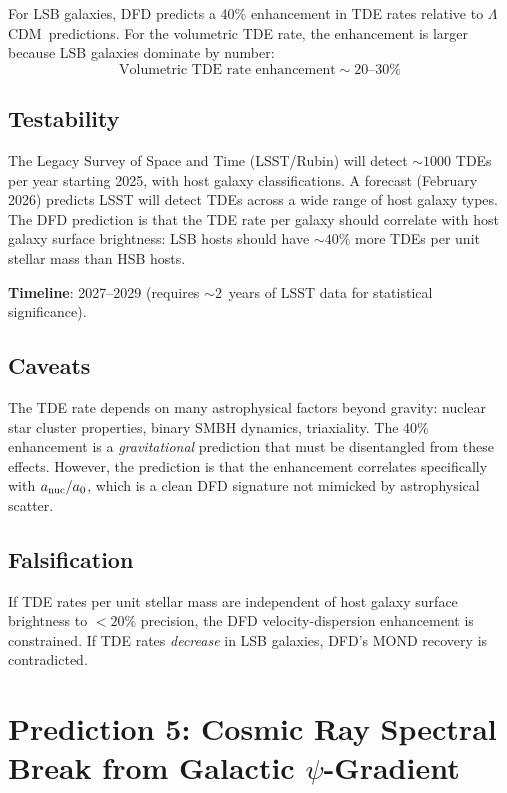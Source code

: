 \documentclass[11pt]{article}
\newcommand{\LCDM}{$\Lambda$CDM}
\begin{document}
For LSB galaxies, DFD predicts a 40\% enhancement in TDE rates relative
to \LCDM\ predictions. For the volumetric TDE rate, the enhancement is
larger because LSB galaxies dominate by number:
\begin{equation}
\text{Volumetric TDE rate enhancement} \sim 20\text{--}30\%
\end{equation}

\subsection{Testability}

The Legacy Survey of Space and Time (LSST/Rubin) will detect $\sim 1000$
TDEs per year starting 2025, with host galaxy classifications. A forecast
(February 2026) predicts LSST will detect TDEs across a wide range of
host galaxy types. The DFD prediction is that the TDE rate per galaxy
should correlate with host galaxy surface brightness: LSB hosts should
have $\sim 40\%$ more TDEs per unit stellar mass than HSB hosts.

\textbf{Timeline}: 2027--2029 (requires $\sim 2$~years of LSST data for
statistical significance).

\subsection{Caveats}

The TDE rate depends on many astrophysical factors beyond gravity: nuclear
star cluster properties, binary SMBH dynamics, triaxiality. The 40\%
enhancement is a \emph{gravitational} prediction that must be disentangled
from these effects. However, the prediction is that the enhancement
correlates specifically with $a_{\rm nuc}/a_0$, which is a clean DFD
signature not mimicked by astrophysical scatter.

\subsection{Falsification}

If TDE rates per unit stellar mass are independent of host galaxy surface
brightness to $< 20\%$ precision, the DFD velocity-dispersion enhancement
is constrained. If TDE rates \emph{decrease} in LSB galaxies, DFD's
MOND recovery is contradicted.

\section{Prediction 5: Cosmic Ray Spectral Break from Galactic $\psi$-Gradient}
\label{sec:cosmicray}
\end{document}
